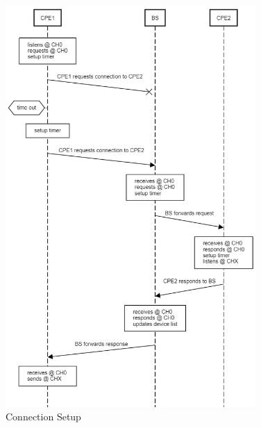 \begin{figure}[ht]
{\begin{minipage}[c][1.5\width]{
	   0.4\textwidth}
	   \includegraphics[width=0.85\textwidth]{figures/sequence_diagram_first_miss_com.png}
	\end{minipage}}
\caption{Connection Setup}
\label{fig:connection_setup}
\end{figure}


